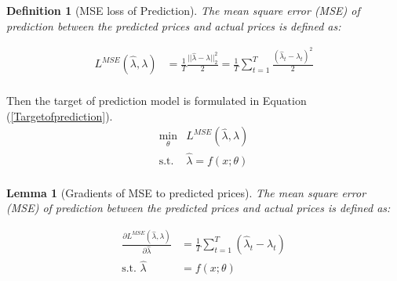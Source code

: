 \documentclass[journal]{IEEEtran}
\newtheorem{definition}{Definition}
\newtheorem{lemma}{Lemma}
\begin{document}
\begin{definition}[MSE loss of Prediction]
  The mean square error (MSE) of prediction between the predicted prices and actual prices is defined as:  
\end{definition}
\begin{equation}
  \label{MSE}
  \begin{aligned}
    L^{MSE}(\hat{\lambda}, \lambda) &= \frac{1}{T} \frac{||\hat{\lambda} - \lambda ||^2_2}{2}  = \frac{1}{T} \sum_{t=1}^T \frac{(\hat{\lambda}_t - \lambda_t)^2}{2} \\
  \end{aligned}
\end{equation}

Then the target of prediction model is formulated in Equation (\ref{Targetofprediction}).
\begin{equation}
  \label{Targetofprediction}
  \begin{aligned}
    \min_{\theta} &L^{MSE}(\hat{\lambda}, \lambda) \\
    \text{s.t. } &\hat{\lambda} = f(x; \theta) \\
  \end{aligned}
\end{equation}

\begin{lemma}[Gradients of MSE to predicted prices]
  The mean square error (MSE) of prediction between the predicted prices and actual prices is defined as:
\end{lemma}
\begin{equation}
  \label{gradientsofMSE}
  \begin{aligned}
    \frac{\partial L^{MSE}(\hat{\lambda}, \lambda)}{\partial \hat{\lambda}} &= \frac{1}{T} \sum_{t=1}^T (\hat{\lambda}_t - \lambda_t) \\
    \text{s.t. } \hat{\lambda} &= f(x; \theta) \\
  \end{aligned}
\end{equation}
\end{document}
